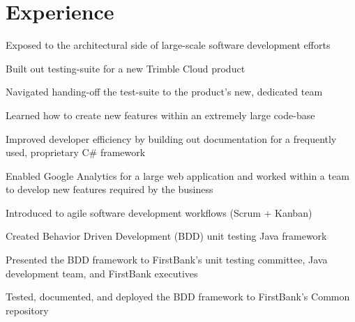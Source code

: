 \documentclass[]{darling-resume-openfont}
\begin{document}
\hfill
\begin{minipage}[t]{0.66\textwidth} 


\section{Experience}
\vspace{\topsep} %
\begin{tightemize}
\item Exposed to the architectural side of large-scale software development efforts
\item Built out testing-suite for a new Trimble Cloud product
\item Navigated handing-off the test-suite to the product's new, dedicated team
\end{tightemize}
\sectionsep

\begin{tightemize}
\item Learned how to create new features within an extremely large code-base
\item Improved developer efficiency by building out documentation for a frequently used, proprietary C\#{} framework
\item Enabled Google Analytics for a large web application and worked within a team to develop new features required by the business
\end{tightemize}
\sectionsep

\begin{tightemize}
\item Introduced to agile software development workflows (Scrum + Kanban)
\item Created Behavior Driven Development (BDD) unit testing Java framework
\item Presented the BDD framework to FirstBank's unit testing committee, Java development team, and FirstBank executives
\item Tested, documented, and deployed the BDD framework to FirstBank's Common repository
\end{tightemize}
\sectionsep


\end{minipage}
\end{document}

